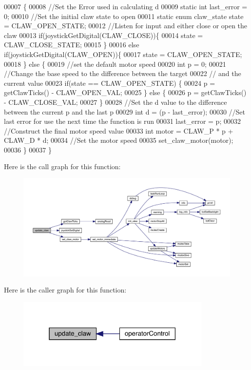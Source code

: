 \begin{DoxyCode}
00007                    \{
00008   \textcolor{comment}{//Set the Error used in calculating d}
00009   \textcolor{keyword}{static} \textcolor{keywordtype}{int} last\_error = 0;
00010   \textcolor{comment}{//Set the initial claw state to open}
00011   \textcolor{keyword}{static} \textcolor{keyword}{enum} claw_state state = CLAW_OPEN_STATE;
00012   \textcolor{comment}{//Listen for input and either close or open the claw}
00013   \textcolor{keywordflow}{if}(joystickGetDigital(CLAW_CLOSE))\{
00014     state = CLAW_CLOSE_STATE;
00015   \}
00016   \textcolor{keywordflow}{else} \textcolor{keywordflow}{if}(joystickGetDigital(CLAW_OPEN))\{
00017     state = CLAW_OPEN_STATE;
00018   \} \textcolor{keywordflow}{else} \{
00019     \textcolor{comment}{//set the default motor speed}
00020     \textcolor{keywordtype}{int} p = 0;
00021     \textcolor{comment}{//Change the base speed to the difference between the target}
00022     \textcolor{comment}{// and the current value}
00023     \textcolor{keywordflow}{if}(state == CLAW_OPEN_STATE) \{
00024       p = getClawTicks() - CLAW_OPEN_VAL;
00025     \} \textcolor{keywordflow}{else} \{
00026       p = getClawTicks() - CLAW_CLOSE_VAL;
00027     \}
00028     \textcolor{comment}{//Set the d value to the difference between the current p and the last p}
00029     \textcolor{keywordtype}{int} d = (p - last\_error);
00030     \textcolor{comment}{//Set last error for use the next time the function is run}
00031     last\_error = p;
00032     \textcolor{comment}{//Construct the final motor speed value}
00033     \textcolor{keywordtype}{int} motor = CLAW_P * p + CLAW_D * d;
00034     \textcolor{comment}{//Set the motor speed}
00035     set_claw_motor(motor);
00036   \}
00037 \}
\end{DoxyCode}
Here is the call graph for this function\+:\nopagebreak
\begin{figure}[H]
\begin{center}
\leavevmode
\includegraphics[width=350pt]{claw_8h_a0122b78972344264b8a276a559cfce4a_cgraph}
\end{center}
\end{figure}
Here is the caller graph for this function\+:\nopagebreak
\begin{figure}[H]
\begin{center}
\leavevmode
\includegraphics[width=274pt]{claw_8h_a0122b78972344264b8a276a559cfce4a_icgraph}
\end{center}
\end{figure}
